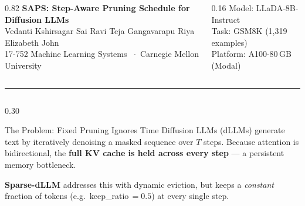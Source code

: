 \documentclass[final]{beamer}
\newcommand{\sep}{\vspace{0.8em}}
\begin{document}
\begin{frame}[t]{}

\begin{columns}[t]
  \begin{column}{0.82\linewidth}
    {\color{cmuRed}\Huge\bfseries SAPS: Step-Aware Pruning Schedule for Diffusion LLMs}\\[0.4em]
    {\Large Vedanti Kshirsagar \quad Sai Ravi Teja Gangavarapu \quad Riya Elizabeth John}\\[0.2em]
    {\large 17-752 Machine Learning Systems \ $\cdot$\ Carnegie Mellon University}
  \end{column}
  \begin{column}{0.16\linewidth}
    \raggedleft
    {\color{cmuGray}\large Model: LLaDA-8B-Instruct\\
                    Task: GSM8K (1{,}319 examples)\\
                    Platform: A100-80\,GB (Modal)}
  \end{column}
\end{columns}

\vspace{1.2em}
\rule{\linewidth}{2pt}
\vspace{0.8em}

\begin{columns}[t,totalwidth=\linewidth]

\begin{column}{0.30\linewidth}

  \begin{block}{The Problem: Fixed Pruning Ignores Time}
    Diffusion LLMs (dLLMs) generate text by iteratively denoising a
    masked sequence over $T$ steps. Because attention is bidirectional,
    the \textbf{full KV cache is held across every step} — a persistent
    memory bottleneck.

    \sep
    \textbf{Sparse-dLLM} addresses this with dynamic eviction, but keeps a
    \emph{constant} fraction of tokens (e.g.\ keep\_ratio\,$= 0.5$) at
    every single step.

    \begin{center}
    \end{center}


\end{block}
\end{column}
\end{columns}
\end{frame}
\end{document}
